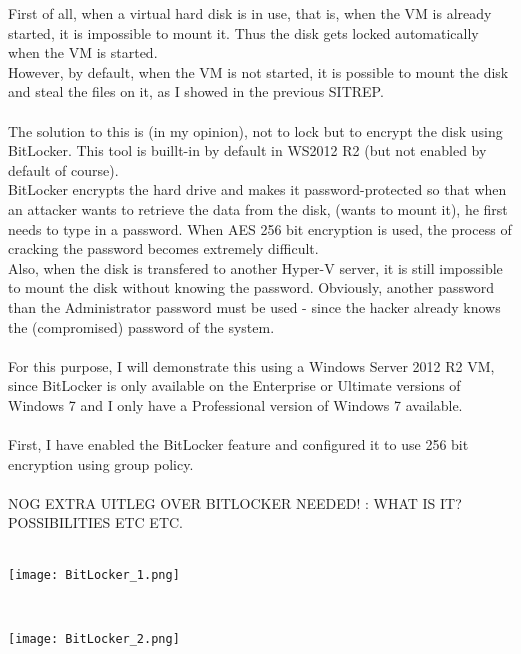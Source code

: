 First of all, when a virtual hard disk is in use, that is, when the VM is already started, it is impossible to mount it. Thus the disk gets locked automatically when the VM is started. \\
However, by default, when the VM is not started, it is possible to mount the disk and steal the files on it, as I showed in the previous SITREP. \\ \\
The solution to this is (in my opinion), not to lock but to encrypt the disk using BitLocker. This tool is buillt-in by default in WS2012 R2 (but not enabled by default of course). \\
BitLocker encrypts the hard drive and makes it password-protected so that when an attacker wants to retrieve the data from the disk, (wants to mount it), he first needs to type in a password. When AES 256 bit encryption is used, the process of cracking the password becomes extremely difficult. \\
Also, when the disk is transfered to another Hyper-V server, it is still impossible to mount the disk without knowing the password. Obviously, another password than the Administrator password must be used - since the hacker already knows the (compromised) password of the system. \\ \\
For this purpose, I will demonstrate this using a Windows Server 2012 R2 VM, since BitLocker is only available on the Enterprise or Ultimate versions of Windows 7 and I only have a Professional version of Windows 7 available. \\ \\
First, I have enabled the BitLocker feature and configured it to use 256 bit encryption using group policy. \\ \\
NOG EXTRA UITLEG OVER BITLOCKER NEEDED! : WHAT IS IT? POSSIBILITIES ETC ETC.
$\;$ \\ \\
\noindent\begin{minipage}{\textwidth}
    \centering
    \texttt{[image: BitLocker\_1.png]}
\end{minipage}
$\;$ \\ \\
\noindent\begin{minipage}{\textwidth}
    \centering
    \texttt{[image: BitLocker\_2.png]}
\end{minipage}
